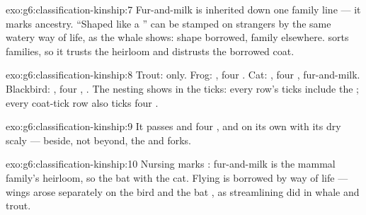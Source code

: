 \begin{solution}{exo:g6:classification-kinship:7}
Fur-and-milk is inherited down one family line --- it marks
ancestry. ``Shaped like a '' can be stamped on strangers
by the same watery way of life, as the whale shows: shape
borrowed, family elsewhere.  sorts families,
so it trusts the heirloom and distrusts the borrowed coat.
\end{solution}

\begin{solution}{exo:g6:classification-kinship:8}
Trout:  only. Frog: , four . Cat:
, four , fur-and-milk. Blackbird: ,
four , . The nesting shows in the ticks: every
row's ticks include the ; every coat-tick row also
ticks four .
\end{solution}

\begin{solution}{exo:g6:classification-kinship:9}
It passes  and four , and  on its own
 with its dry scaly  --- beside, not beyond, the
 and  forks.
\end{solution}

\begin{solution}{exo:g6:classification-kinship:10}
Nursing marks : fur-and-milk is the mammal family's
heirloom, so the bat  with the cat. Flying is
borrowed by way of life --- wings arose separately on the
bird  and the bat , as streamlining did in
whale and trout.
\end{solution}


